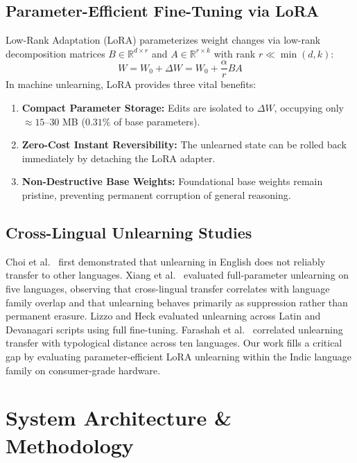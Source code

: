 \documentclass[11pt,a4paper]{article}
\begin{document}
\subsection{Parameter-Efficient Fine-Tuning via LoRA}
Low-Rank Adaptation (LoRA) \cite{hu2022} parameterizes weight changes via low-rank decomposition matrices $B \in \mathbb{R}^{d \times r}$ and $A \in \mathbb{R}^{r \times k}$ with rank $r \ll \min(d, k)$:
\begin{equation}
    W = W_0 + \Delta W = W_0 + \frac{\alpha}{r} B A
\end{equation}
In machine unlearning, LoRA provides three vital benefits:
\begin{enumerate}
    \item \textbf{Compact Parameter Storage:} Edits are isolated to $\Delta W$, occupying only $\approx 15$--$30$ MB ($0.31\%$ of base parameters).
    \item \textbf{Zero-Cost Instant Reversibility:} The unlearned state can be rolled back immediately by detaching the LoRA adapter.
    \item \textbf{Non-Destructive Base Weights:} Foundational base weights remain pristine, preventing permanent corruption of general reasoning.
\end{enumerate}

\subsection{Cross-Lingual Unlearning Studies}
Choi et al.\ \cite{choi2024} first demonstrated that unlearning in English does not reliably transfer to other languages. Xiang et al.\ \cite{xiang2026} evaluated full-parameter unlearning on five languages, observing that cross-lingual transfer correlates with language family overlap and that unlearning behaves primarily as suppression rather than permanent erasure. Lizzo and Heck \cite{lizzo2026} evaluated unlearning across Latin and Devanagari scripts using full fine-tuning. Farashah et al.\ \cite{farashah2026} correlated unlearning transfer with typological distance across ten languages. Our work fills a critical gap by evaluating parameter-efficient LoRA unlearning within the Indic language family on consumer-grade hardware.

\section{System Architecture \& Methodology}
\label{sec:architecture}
\end{document}
